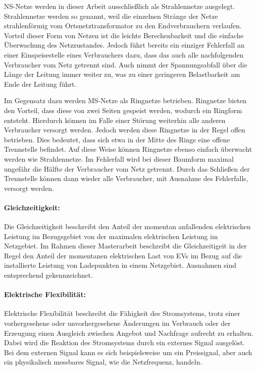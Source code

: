 \gls{NS}-Netze werden in dieser Arbeit ausschließlich als Strahlennetze ausgelegt.
Strahlennetze werden so genannt, weil die einzelnen Stränge der Netze strahlenförmig vom Ortsnetztransformator zu den Endverbrauchern verlaufen. \cite{Agora2019}
Vorteil dieser Form von Netzen ist die leichte Berechenbarkeit und die einfache Überwachung des Netzzustandes.
Jedoch führt bereits ein einziger Fehlerfall an einer Einspeisestelle eines Verbrauchers dazu, dass das auch alle nachfolgenden Verbraucher vom Netz getrennt sind.
Auch nimmt der Spannungsabfall über die Länge der Leitung immer weiter zu, was zu einer geringeren Belastbarkeit am Ende der Leitung führt. \cite{WNG2020}\medskip

Im Gegensatz dazu werden \gls{MS}-Netze als Ringnetze betrieben.
Ringnetze bieten den Vorteil, dass diese von zwei Seiten gespeist werden, wodurch ein Ringform entsteht.
Hierdurch können im Falle einer Störung weiterhin alle anderen Verbraucher versorgt werden.
Jedoch werden diese Ringnetze in der Regel offen betrieben.
Dies bedeutet, dass sich etwa in der Mitte des Rings eine offene Trennstelle befindet.
Auf diese Weise können Ringnetze ebenso einfach überwacht werden wie Strahlennetze.
Im Fehlerfall wird bei dieser Baumform maximal ungefähr die Hälfte der Verbraucher vom Netz getrennt.
Durch das Schließen der Trennstelle können dann wieder alle Verbraucher, mit Ausnahme des Fehlerfalls, versorgt werden. \cite{WNG2020} \cite{Westermann2019}


\paragraph{Gleichzeitigkeit:}

Die Gleichzeitigkeit beschreibt den Anteil der momentan anfallenden elektrischen Leistung im Bezugsgebiet von der maximalen elektrischen Leistung im Netzgebiet. \cite{Agora2019} 
Im Rahmen dieser Masterarbeit beschreibt die Gleichzeitigeit in der Regel den Anteil der momentanen elektrischen Last von \glspl{EV} im Bezug auf die installierte Leistung von Ladepunkten in einem Netzgebiet.
Ausnahmen sind entsprechend gekennzeichnet.


\paragraph{Elektrische Flexibilität:}

Elektrische Flexibilität beschreibt die Fähigkeit des Stromsystems, trotz einer vorhergesehene oder unvorhergesehene Änderungen im Verbrauch oder der Erzeugung einen Ausgleich zwischen Angebot und Nachfrage aufrecht zu erhalten.
Dabei wird die Reaktion des Stromsystems durch ein externes Signal ausgelöst.
Bei dem externen Signal kann es sich beispielsweise um ein Preissignal, aber auch ein physikalisch messbares Signal, wie die Netzfrequenz, handeln. \medskip

